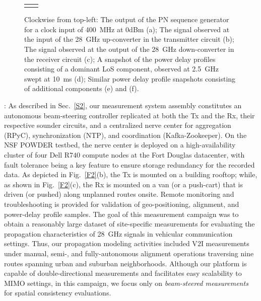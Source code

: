 \documentclass[12pt, draftcls, onecolumn]{IEEEtran}
\begin{document}
\begin{figure}[t]
\begin{tabular}{cc}
\begin{minipage}{0.5\linewidth}
        \end{minipage}
    \end{tabular}
    \caption{Clockwise from top-left: The output of the PN sequence generator for a clock input of \SI{400}{\mega\hertz} at $0$dBm (a); The signal observed at the input of the \SI{28}{\giga\hertz} up-converter in the transmitter circuit (b); The signal observed at the output of the \SI{28}{\giga\hertz} down-converter in the receiver circuit (c); A snapshot of the power delay profiles consisting of a dominant LoS component, observed at \SI{2.5}{\giga\hertz} swept at \SI{10}{\milli\second} (d); Similar power delay profile snapshots consisting of additional components (e) and (f).}
    \label{F3}
\end{figure}

: As described in Sec.~\ref{S2}, our measurement system assembly constitutes an autonomous beam-steering controller replicated at both the Tx and the Rx, their respective sounder circuits, and a centralized nerve center for aggregation (RPyC), synchronization (NTP), and coordination (Kafka-Zookeeper). On the NSF POWDER testbed, the nerve center is deployed on a high-availability cluster of four Dell R$740$ compute nodes at the Fort Douglas datacenter, with fault tolerance being a key feature to ensure storage redundancy for the recorded data. As depicted in Fig.~\ref{F2}(b), the Tx is mounted on a building rooftop; while, as shown in Fig.~\ref{F2}(c), the Rx is mounted on a van (or a push-cart) that is driven (or pushed) along unplanned routes onsite. Remote monitoring and troubleshooting is provided for validation of geo-positioning, alignment, and power-delay profile samples. The goal of this measurement campaign was to obtain a reasonably large dataset of site-specific measurements for evaluating the propagation characteristics of \SI{28}{\giga\hertz} signals in vehicular communication settings. Thus, our propagation modeling activities included V$2$I measurements under manual, semi-, and fully-autonomous alignment operations traversing nine routes spanning urban and suburban neighborhoods. Although our platform is capable of double-directional measurements and facilitates easy scalability to MIMO settings, in this campaign, we focus only on \emph{beam-steered measurements} for spatial consistency evaluations.
\end{document}
